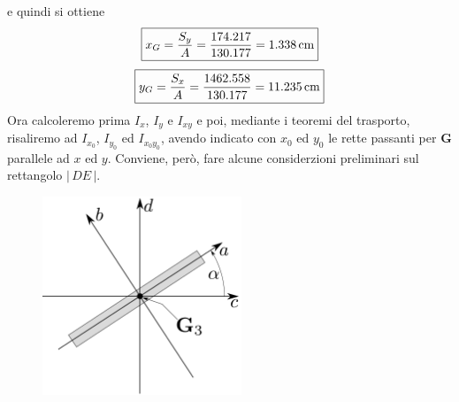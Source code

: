 e quindi si ottiene
\begin{equation*}
\boxed{
x_G = \frac{S_y}{A} = \frac{174.217}{130.177} = 1.338\,\textup{cm}
}
\end{equation*}
\begin{equation*}
\boxed{
y_G = \frac{S_x}{A} = \frac{1462.558}{130.177} = 11.235\,\textup{cm}
}
\end{equation*}
Ora calcoleremo prima $I_x$, $I_y$ e $I_{xy}$ e poi, mediante i teoremi del trasporto, risaliremo ad $I_{x_0}$, $I_{y_0}$ ed $I_{x_{0}y_{0}}$, avendo indicato con $x_0$ ed $y_0$ le rette passanti per $\mathbf{G}$ parallele ad $x$ ed $y$. Conviene, però, fare alcune considerzioni preliminari sul rettangolo $\lvert\,DE\,\lvert$.
\renewcommand{\thefigure}{6.1~-~2}
\begin{figure}[ht]
\centering
\includegraphics[width=0.53\textwidth]{Immagini/Parte_6/Esercizio6_1/Esercizio6_1_2.pdf}
\caption{}
\label{Esercizio6-1-2}
\end{figure}
